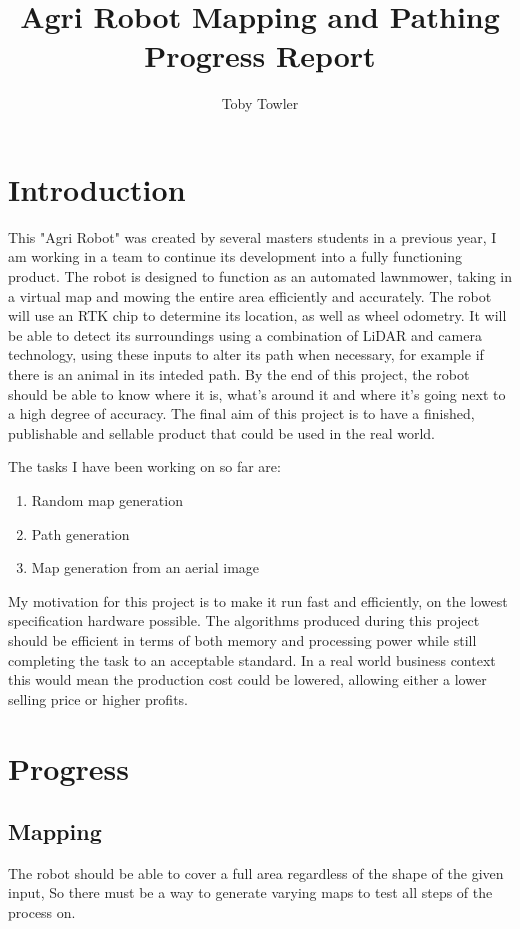 \documentclass[progress]{cmpreport}
\title{Agri Robot Mapping and Pathing Progress Report}
\author{Toby Towler}
\begin{document}
\maketitle

\section{Introduction}
This "Agri Robot" was created by several masters students in a previous year,
I am working in a team to continue its development into a fully functioning product.
The robot is designed to function as an automated lawnmower, taking in a virtual map and mowing the entire area efficiently and accurately.
The robot will use an RTK chip to determine its location, as well as wheel odometry.
It will be able to detect its surroundings using a combination of LiDAR and camera technology, using these inputs to alter its path when necessary, for example if there is an animal in its inteded path.
By the end of this project, the robot should be able to know where it is, what's around it and where it's going next to a high degree of accuracy.
The final aim of this project is to have a finished, publishable and sellable product that could be used in the real world.

The tasks I have been working on so far are:
\begin{enumerate}
	\item {Random map generation}
	\item {Path generation}
	\item {Map generation from an aerial image}
\end{enumerate}

My motivation for this project is to make it run fast and efficiently, on the lowest specification hardware possible.
The algorithms produced during this project should be efficient in terms of both memory and processing power while still completing the task to an acceptable standard.
In a real world business context this would mean the production cost could be lowered, allowing either a lower selling price or higher profits.



\section{Progress}
\subsection{Mapping}
The robot should be able to cover a full area regardless of the shape of the given input,
So there must be a way to generate varying maps to test all steps of the process on.
\end{document}
